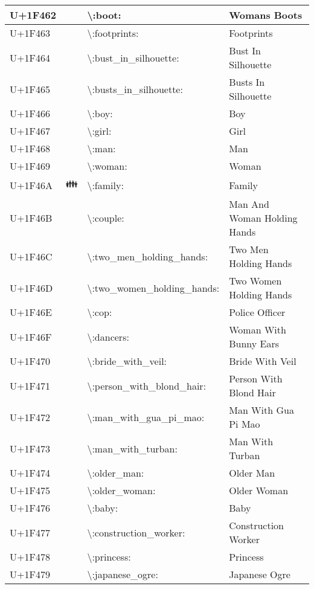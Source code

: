 \begin{table}[h]
\begin{tabulary}{\linewidth}{|L|L|L|L|}
\hline
U+1F462 & 👢 & {\textbackslash}:boot: & Womans Boots \\
\hline
U+1F463 & 👣 & {\textbackslash}:footprints: & Footprints \\
\hline
U+1F464 & 👤 & {\textbackslash}:bust\_in\_silhouette: & Bust In Silhouette \\
\hline
U+1F465 & 👥 & {\textbackslash}:busts\_in\_silhouette: & Busts In Silhouette \\
\hline
U+1F466 & 👦 & {\textbackslash}:boy: & Boy \\
\hline
U+1F467 & 👧 & {\textbackslash}:girl: & Girl \\
\hline
U+1F468 & 👨 & {\textbackslash}:man: & Man \\
\hline
U+1F469 & 👩 & {\textbackslash}:woman: & Woman \\
\hline
U+1F46A & 👪 & {\textbackslash}:family: & Family \\
\hline
U+1F46B & 👫 & {\textbackslash}:couple: & Man And Woman Holding Hands \\
\hline
U+1F46C & 👬 & {\textbackslash}:two\_men\_holding\_hands: & Two Men Holding Hands \\
\hline
U+1F46D & 👭 & {\textbackslash}:two\_women\_holding\_hands: & Two Women Holding Hands \\
\hline
U+1F46E & 👮 & {\textbackslash}:cop: & Police Officer \\
\hline
U+1F46F & 👯 & {\textbackslash}:dancers: & Woman With Bunny Ears \\
\hline
U+1F470 & 👰 & {\textbackslash}:bride\_with\_veil: & Bride With Veil \\
\hline
U+1F471 & 👱 & {\textbackslash}:person\_with\_blond\_hair: & Person With Blond Hair \\
\hline
U+1F472 & 👲 & {\textbackslash}:man\_with\_gua\_pi\_mao: & Man With Gua Pi Mao \\
\hline
U+1F473 & 👳 & {\textbackslash}:man\_with\_turban: & Man With Turban \\
\hline
U+1F474 & 👴 & {\textbackslash}:older\_man: & Older Man \\
\hline
U+1F475 & 👵 & {\textbackslash}:older\_woman: & Older Woman \\
\hline
U+1F476 & 👶 & {\textbackslash}:baby: & Baby \\
\hline
U+1F477 & 👷 & {\textbackslash}:construction\_worker: & Construction Worker \\
\hline
U+1F478 & 👸 & {\textbackslash}:princess: & Princess \\
\hline
U+1F479 & 👹 & {\textbackslash}:japanese\_ogre: & Japanese Ogre \\

\end{tabulary}
\end{table}
